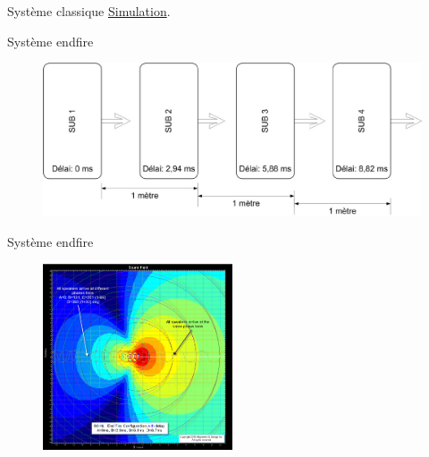 \documentclass[aspectratio=169]{beamer}
\begin{document}
\begin{frame}{Système classique}
	\href{https://www.nexo-sa.com/wp-content/uploads/NS1_v3305b18.zip}{Simulation}.
\end{frame}
\begin{frame}{Système endfire}
  	\begin{figure}[!h]
	\includegraphics[width=1\textwidth]{figure/endfire3-1.jpg}
	\end{figure}
\end{frame}
\begin{frame}{Système endfire}
  	\begin{figure}[!h]
	\includegraphics[width=0.5\textwidth]{figure/010b-end-fire-array-63-hz-1meter-with-2-9ms-delay-closeup.png}
	\end{figure}
\end{frame}
\end{document}
